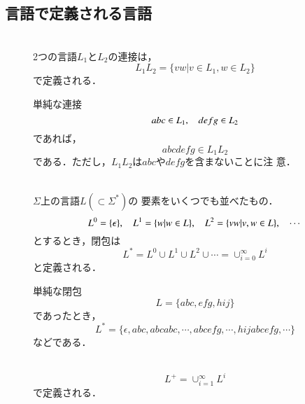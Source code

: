 \subsection{言語で定義される言語}
\begin{description}
 \item [] \mbox{} \\
 2つの言語$L_1$と$L_2$の連接は，
            \[
             L_1 L_2 = \{vw | v \in L_1 , w \in L_2\}
            \]
            で定義される．
            \begin{myexample}{単純な連接}
             \[
              abc \in L_1 , \hspace{2ex} defg \in L_2
             \]
             であれば，
             \[
              abcdefg \in L_1 L_2
             \]
             である．ただし，$L_1 L_2$は$abc$や$defg$を含まないことに注
             意．
            \end{myexample}
            
 \item [] \mbox{} \\
 $\Sigma$上の言語$L (\subset \Sigma^*) $の
            要素をいくつでも並べたもの．
            \[
             L^0 = \{\epsilon\}, \hspace{2ex} L^1 = \{w | w \in L\}, \hspace{2ex} L^2 = \{vw
            | v, w \in L\}, \hspace{2ex} \cdots 
            \]
            とするとき，閉包は
            \[
            \displaystyle
             L^* = L^0 \cup L^1 \cup L^2 \cup \cdots = \cup^{\infty}_{i
            = 0} L^i
            \]
            と定義される．
            \begin{myexample}{単純な閉包}
             \[
             L = \{abc, efg, hij\}
             \]
             であったとき，
             \[
              L^* = \{\epsilon, abc, abcabc, \cdots, abcefg, \cdots,
             hijabcefg, \cdots\}
             \]
             などである．
            \end{myexample}
            
 \item [] \mbox{} \\
            \[
            \displaystyle
             L^+ = \cup^{\infty}_{i = 1} L^i
            \]
            で定義される．
\end{description}

